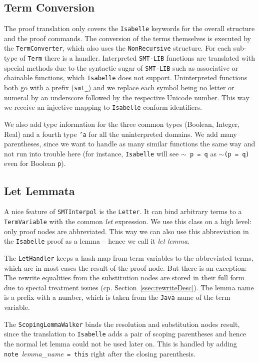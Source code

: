 \documentclass[10pt,a4paper]{article}
\newcommand{\si}{\texttt{SMTInterpol}\xspace}
\newcommand{\isa}{\texttt{Isabelle}\xspace}
\newcommand{\slib}{\texttt{SMT-LIB}\xspace}
\newcommand{\jav}{\texttt{Java}\xspace}
\newcommand{\ttt}{\texttt}
\newcommand{\negat}{\ensuremath{\sim}}
\newcommand{\nega}{\negat\xspace}
\begin{document}
\subsection*{Term Conversion}
The proof translation only covers the \isa keywords for the overall structure and the proof commands. The conversion of the terms themselves is executed by the \ttt{TermConverter}, which also uses the \ttt{NonRecursive} structure. For each sub-type of \ttt{Term} there is a handler. Interpreted \slib functions are translated with special methods due to the syntactic sugar of \slib such as associative or chainable functions, which \isa does not support. Uninterpreted functions both go with a prefix (\ttt{smt\_}) and we replace each symbol being no letter or numeral by an underscore followed by the respective Unicode number. This way we receive an injective mapping to \isa conform identifiers.

We also add type information for the three common types (Boolean, Integer, Real) and a fourth type \ttt{'a} for all the uninterpreted domains. We add many parentheses, since we want to handle as many similar functions the same way and not run into trouble here (for instance, \isa will see \mbox{\ttt{\nega p = q}} as \mbox{\ttt{\nega (p = q)}} even for Boolean \ttt{p}).
%
\subsection*{Let Lemmata}
%
A nice feature of \si is the \ttt{Letter}. It can bind arbitrary terms to a \ttt{TermVariable} with the common \emph{let} expression. We use this class on a high level: only proof nodes are abbreviated. This way we can also use this abbreviation in the \isa proof as a lemma -- hence we call it \emph{let lemma}.

The \ttt{LetHandler} keeps a hash map from term variables to the abbreviated terms, which are in most cases the result of the proof node. But there is an exception: The rewrite equalities from the substitution nodes are stored in their full form due to special treatment issues (cp. Section~\ref{ssec:rewriteDesc}). The lemma name is a prefix with a number, which is taken from the \jav name of the term variable.

The \ttt{ScopingLemmaWalker} binds the resolution and substitution nodes result, since the translation to \isa adds a pair of scoping parentheses and hence the normal let lemma could not be used later on. This is handled by adding \mbox{\ttt{note} \textit{lemma\_name} \ttt{= this}} right after the closing parenthesis.
%
\end{document}
